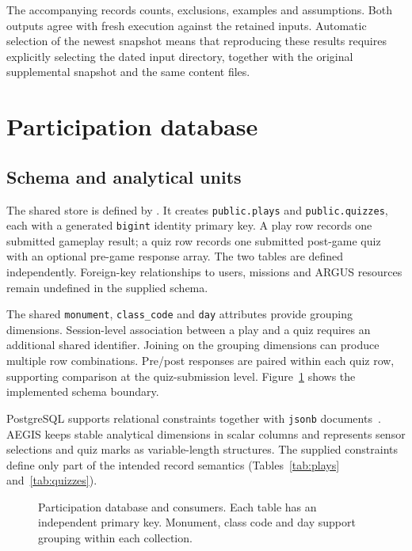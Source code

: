 \documentclass[10pt,a4paper]{article}
\begin{document}
The accompanying  records counts, exclusions, examples and assumptions. Both outputs agree with fresh execution against the retained inputs. Automatic selection of the newest snapshot means that reproducing these results requires explicitly selecting the dated input directory, together with the original supplemental snapshot and the same content files.

\section{Participation database}
\subsection{Schema and analytical units}
The shared store is defined by . It creates \texttt{public.plays} and \texttt{public.quizzes}, each with a generated \texttt{bigint} identity primary key. A play row records one submitted gameplay result; a quiz row records one submitted post-game quiz with an optional pre-game response array. The two tables are defined independently. Foreign-key relationships to users, missions and ARGUS resources remain undefined in the supplied schema.

The shared \texttt{monument}, \texttt{class\_code} and \texttt{day} attributes provide grouping dimensions. Session-level association between a play and a quiz requires an additional shared identifier. Joining on the grouping dimensions can produce multiple row combinations. Pre/post responses are paired within each quiz row, supporting comparison at the quiz-submission level. Figure~\ref{fig:database} shows the implemented schema boundary.

PostgreSQL supports relational constraints together with \texttt{jsonb} documents~\cite{pgjson}. AEGIS keeps stable analytical dimensions in scalar columns and represents sensor selections and quiz marks as variable-length structures. The supplied constraints define only part of the intended record semantics (Tables~\ref{tab:plays} and~\ref{tab:quizzes}).
\begin{figure}[htbp]
\centering
\caption{Participation database and consumers. Each table has an independent primary key. Monument, class code and day support grouping within each collection.}\label{fig:database}
\end{figure}
\end{document}
